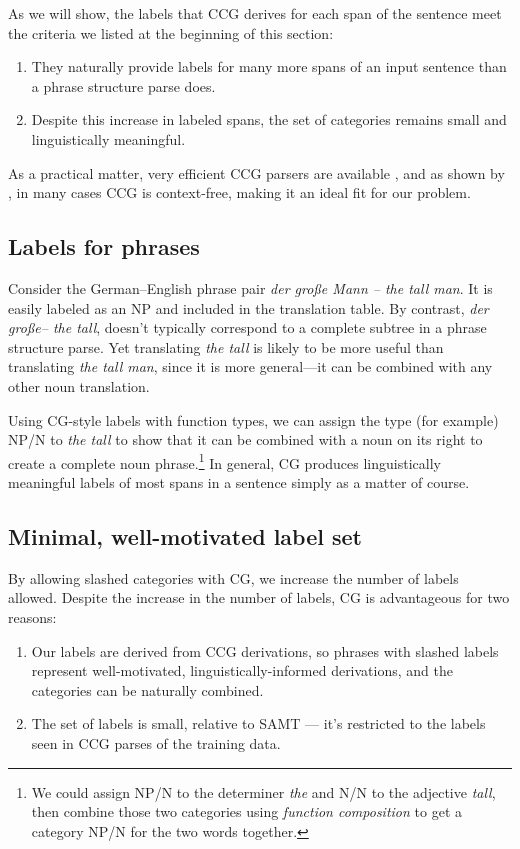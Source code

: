 \documentclass[a4paper]{article}
\begin{document}
As we will show, the labels that CCG derives for each span of the sentence meet the criteria we listed at the beginning of this section:
\begin{enumerate}
\item They naturally provide labels for many more spans of an input sentence than a phrase structure parse does.
\item Despite this increase in labeled spans, the set of categories remains small and linguistically meaningful.
\end{enumerate}

As a practical matter, very efficient CCG parsers are available \cite{candc}, and as shown by , in many cases CCG is context-free, making it an ideal fit for our problem.

\subsection{Labels for phrases}

Consider the German--English phrase pair {\em der gro\ss{}e Mann -- the tall man}. It is easily labeled as an NP and included in the translation table. By contrast, {\em der gro\ss{}e-- the tall}, doesn't typically correspond to a complete subtree in a phrase structure parse. Yet translating {\em the tall} is likely to be more useful than translating {\em the tall man}, since it is more general---it can be combined with any other noun translation.

Using CG-style labels with function types, we can assign the type (for example) NP/N to {\em the tall} to show that it can be combined with a noun on its right to create a complete noun phrase.\footnote{We could assign NP/N to the determiner {\em the} and N/N to the adjective {\em tall}, then combine those two categories using {\em function composition} to get a category NP/N for the two words together.}
In general, CG produces linguistically meaningful labels of most spans in a sentence simply as a matter of course.

\subsection{Minimal, well-motivated label set}

By allowing slashed categories with CG, we increase the number of labels allowed. Despite the increase in the number of labels, CG is advantageous for two reasons:
\begin{enumerate}
\item Our labels are derived from CCG derivations, so phrases with slashed labels represent well-motivated, linguistically-informed derivations, and the categories can be naturally combined.
\item The set of labels is small, relative to SAMT --- it's restricted to the labels seen in CCG parses of the training data.
\end{enumerate}
\end{document}
